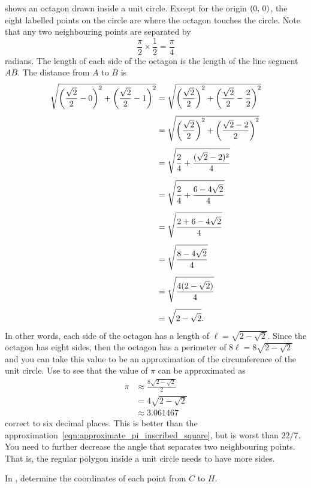 \documentclass[a4paper,oneside,12pt]{article}
\begin{document}
 shows an octagon drawn inside a
unit circle.  Except for the origin $\tuple{0}{0}$, the eight labelled
points on the circle are where the octagon touches the circle.  Note
that any two neighbouring points are separated by
\[
\frac{\pi}{2} \times \frac{1}{2}
=
\frac{\pi}{4}
\]
radians.  The length of each side of the octagon is the length of the
line segment $AB$.  The distance from $A$ to $B$ is
\begin{align*}
\sqrt{
  \parenthesis*{\frac{\sqrt{2}}{2} - 0}^2
  +
  \parenthesis*{\frac{\sqrt{2}}{2} - 1}^2
}
&=
\sqrt{
  \parenthesis*{\frac{\sqrt{2}}{2}}^2
  +
  \parenthesis*{\frac{\sqrt{2}}{2} - \frac{2}{2}}^2
} \\[4pt]
&=
\sqrt{
  \parenthesis*{\frac{\sqrt{2}}{2}}^2
  +
  \parenthesis*{\frac{\sqrt{2} - 2}{2}}^2
} \\[4pt]
&=
\sqrt{
  \frac{2}{4}
  +
  \frac{(\sqrt{2} - 2)^2}{4}
} \\[4pt]
&=
\sqrt{
  \frac{2}{4}
  +
  \frac{6 - 4\sqrt{2}}{4}
} \\[4pt]
&=
\sqrt{
  \frac{
    2 + 6 - 4\sqrt{2}
  }{
    4
  }
} \\[4pt]
&=
\sqrt{
  \frac{
    8 - 4\sqrt{2}
  }{
    4
  }
} \\[4pt]
&=
\sqrt{
  \frac{
    4(2 - \sqrt{2})
  }{
    4
  }
} \\[4pt]
&=
\sqrt{
  2 - \sqrt{2}
}.
\end{align*}
In other words, each side of the octagon has a length of
$\ell = \sqrt{2 - \sqrt{2}}$.  Since the octagon has eight sides, then
the octagon has a perimeter of $8\ell = 8\sqrt{2 - \sqrt{2}}$ and you
can take this value to be an approximation of the circumference of the
unit circle.  Use  to see
that the value of $\pi$ can be approximated as
\begin{align*}
\pi
&\approx
\frac{
  8\sqrt{2 - \sqrt{2}}
}{
  2
} \\[4pt]
&=
4\sqrt{2 - \sqrt{2}} \\[4pt]
&\approx
3.061467
\end{align*}
correct to six decimal places.  This is better than the
approximation~\eqref{eqn:approximate_pi_inscribed_square}, but is
worst than $22 / 7$.  You need to further decrease the angle that
separates two neighbouring points.  That is, the regular polygon
inside a unit circle needs to have more sides.

\begin{exercise}
In , determine the coordinates of
each point from $C$ to $H$.
\end{exercise}
\end{document}

